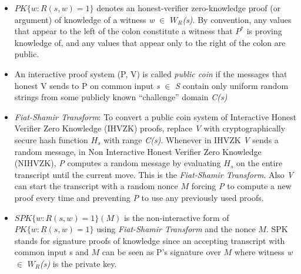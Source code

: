 \documentclass[a4paper]{article}
\newcommand{\quotes}[1]{``#1''}
\begin{document}
\begin{itemize}
  \item $PK\{w : R(s,w) = 1\}$ denotes an honest-verifier zero-knowledge proof (or argument) of knowledge of a witness \textit{w} $\in$ \textit{$W_R$(s)}. By convention, any values that appear to the left of the colon constitute a witness that ${P^{*}}$ is proving knowledge of, and any values that appear only to the right of the colon are public.
  \item An interactive proof system (P, V) is called \emph{public coin} if the messages that honest V sends to P on common input \textit{s} $\in$ \textit{S} contain only uniform random strings from some publicly known \quotes{challenge} domain \textit{C(s)} 
  \item \emph{Fiat-Shamir Transform}: To convert a public coin system of Interactive Honest Verifier Zero Knowledge (IHVZK) proofs, replace \textit{V} with cryptographically secure hash function $H_s$ with range \textit{C(s)}. Whenever in IHVZK \textit{V} sends a random message, in Non Interactive Honest Verifier Zero Knowledge (NIHVZK), \textit{P} computes a random message by evaluating $H_s$ on the entire transcript until the current move. This is the \emph{Fiat-Shamir Transform}. Also \textit{V} can start the transcript with a random nonce $M$ forcing \textit{P} to compute a new proof every time and preventing \textit{P} to use any previously used proofs.
  \item $SPK\{w : R(s,w) = 1\}(M)$ is the non-interactive form of $PK\{w : R(s,w) = 1\}$ using \emph{Fiat-Shamir Transform} and the nonce $M$. SPK stands for signature proofs of knowledge since an accepting transcript with common input s and $M$ can be seen as P's signature over $M$ where witness \textit{w} $\in$ \textit{$W_R$(s)} is the private key. 
\end{itemize}
\end{document}
